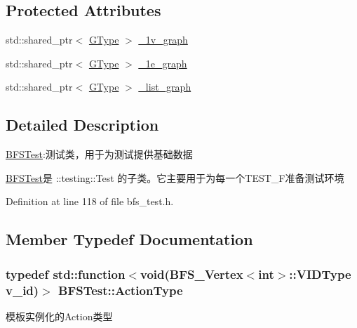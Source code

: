 \subsection*{Protected Attributes}
\begin{DoxyCompactItemize}
\item 
std\+::shared\+\_\+ptr$<$ \hyperlink{class_b_f_s_test_ad38ca5029d5674d467dc71d13f5e5c7c}{G\+Type} $>$ \hyperlink{class_b_f_s_test_a0d7cdb7946902c8d93945a35a222b9d7}{\+\_\+1v\+\_\+graph}
\item 
std\+::shared\+\_\+ptr$<$ \hyperlink{class_b_f_s_test_ad38ca5029d5674d467dc71d13f5e5c7c}{G\+Type} $>$ \hyperlink{class_b_f_s_test_a0158014634e67e6bee3f8f6b1e622ced}{\+\_\+1e\+\_\+graph}
\item 
std\+::shared\+\_\+ptr$<$ \hyperlink{class_b_f_s_test_ad38ca5029d5674d467dc71d13f5e5c7c}{G\+Type} $>$ \hyperlink{class_b_f_s_test_aacf800be44976478c190b2acd338377f}{\+\_\+list\+\_\+graph}
\end{DoxyCompactItemize}


\subsection{Detailed Description}
\hyperlink{class_b_f_s_test}{B\+F\+S\+Test}\+:测试类，用于为测试提供基础数据 

{\ttfamily \hyperlink{class_b_f_s_test}{B\+F\+S\+Test}}是 {\ttfamily \+::testing\+::\+Test} 的子类。它主要用于为每一个{\ttfamily T\+E\+S\+T\+\_\+\+F}准备测试环境 

Definition at line 118 of file bfs\+\_\+test.\+h.



\subsection{Member Typedef Documentation}
\hypertarget{class_b_f_s_test_a4012e860a3e78030ef0f4f544a834177}{}
\subsubsection[{Action\+Type}]{\setlength{\rightskip}{0pt plus 5cm}typedef std\+::function$<$void({\bf B\+F\+S\+\_\+\+Vertex}$<$int$>$\+::V\+I\+D\+Type v\+\_\+id)$>$ {\bf B\+F\+S\+Test\+::\+Action\+Type}}\label{class_b_f_s_test_a4012e860a3e78030ef0f4f544a834177}
模板实例化的\+Action类型 

